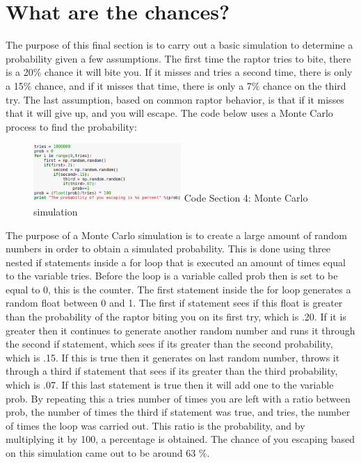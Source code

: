 \documentclass[twocolumn]{revtex4}
\begin{document}
\section{What are the chances?}
	The purpose of this final section is to carry out a basic simulation to determine 
	a probability given a few assumptions.
	The first time the raptor tries to bite, there is a 20\% chance it will bite you. If it misses and tries a second time, there is only a 15\% chance, and if it misses that time, 			there is only a 7\% chance on the third try. The last assumption, based on common raptor
	behavior, is that if it misses that it will give up, and you will escape.
	\clearpage
The code below uses a Monte Carlo process to find the probability:
\begin{figure}[h!]
\includegraphics[width=0.5\textwidth]{Code4.png}
Code Section 4: Monte Carlo simulation

\end{figure} 
The purpose of a Monte Carlo simulation is to create a large amount of random numbers in order 
to obtain a simulated probability. This is done using three nested if statements inside a for loop that is executed an amount of times equal to the variable tries. Before the loop is a variable called prob then is set to be equal to 0, this is the counter. The first statement inside the for loop generates a random float between 0 and 1. The first if statement sees if this float is greater than the probability of the raptor biting you on its first try, which is .20. If it is greater then it continues to generate another random number and runs it through the second if statement, which sees if its greater than the second probability, which is .15. If this is true then it generates on last random number, throws it through a third if statement that sees if its greater than the third probability, which is .07. If this last statement is true then it will add one to the variable prob. By repeating this a tries number of times you are left with a ratio between prob, the number of times the third if statement was true, and tries, the number of times the loop was carried out. This ratio is the probability, and by multiplying it by 100, a percentage is obtained. The chance of you escaping based on this simulation came out to be around 63 \%. 
\end{document}
